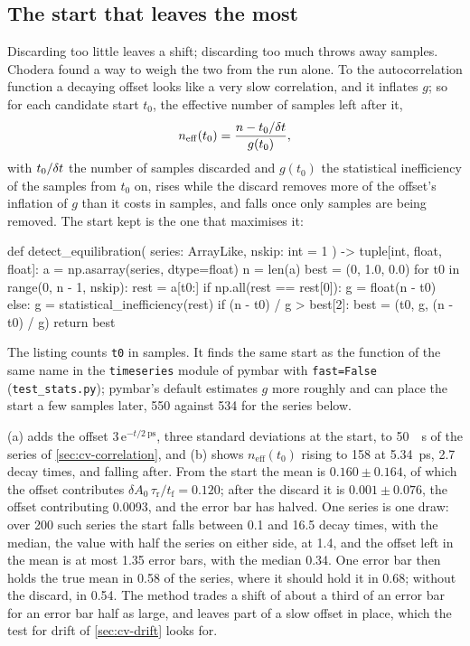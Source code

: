 \subsection*{The start that leaves the most}

Discarding too little leaves a shift; discarding too much throws away
samples. Chodera found a way to weigh the two from the run
alone\cite{Chodera2016}. To the autocorrelation function a decaying offset
looks like a very slow correlation, and it inflates $g$; so for each
candidate start $t_0$, the effective number of samples left after it,
\begin{equation*}
   n_{\mathrm{eff}}(t_0) = \frac{n - t_0/\delta t}{g(t_0)} ,
\end{equation*}
with $t_0/\delta t$ the number of samples discarded and $g(t_0)$ the
statistical inefficiency of the samples from $t_0$ on,
rises while the discard removes more of the offset's inflation of $g$
than it costs in samples, and falls once only samples are being removed.
The start kept is the one that maximises it:

\begin{code}
def detect_equilibration(
    series: ArrayLike, nskip: int = 1
) -> tuple[int, float, float]:
    a = np.asarray(series, dtype=float)
    n = len(a)
    best = (0, 1.0, 0.0)
    for t0 in range(0, n - 1, nskip):
        rest = a[t0:]
        if np.all(rest == rest[0]):
            g = float(n - t0)
        else:
            g = statistical_inefficiency(rest)
        if (n - t0) / g > best[2]:
            best = (t0, g, (n - t0) / g)
    return best
\end{code}

\noindent The listing counts \texttt{t0} in samples. It finds the same
start as the function of the same name in the \texttt{timeseries} module
of pymbar with \texttt{fast=False} (\texttt{test\_stats.py}); pymbar's
default estimates $g$ more roughly and can place the start a few samples
later, 550 against 534 for the series below.

(a) adds the offset $3\,\mathrm{e}^{-t/\SI{2}{\pico
\second}}$, three standard deviations at the start, to \SI{50}{\pico
\second} of the series of \cref{sec:cv-correlation}, and (b) shows
$n_{\mathrm{eff}}(t_0)$ rising to 158 at \SI{5.34}{\pico\second}, 2.7 decay
times, and falling after. From the start the mean is $0.160 \pm 0.164$,
of which the offset contributes $\delta A_0\,\tau_{\mathrm r}/t_{\mathrm f} = 0.120$; after
the discard it is $0.001 \pm 0.076$, the offset contributing 0.0093, and
the error bar has halved. One series is one draw: over 200 such series the
start falls between 0.1 and 16.5 decay times, with the median, the value
with half the series on either side, at 1.4, and
the offset left in the mean is at most 1.35 error bars, with the median
0.34. One error bar then holds the true mean in 0.58 of the series, where
it should hold it in 0.68; without the discard, in 0.54. The method trades
a shift of about a third of an error bar for an error bar half as large,
and leaves part of a slow offset in place, which the test for drift of
\cref{sec:cv-drift} looks for.

